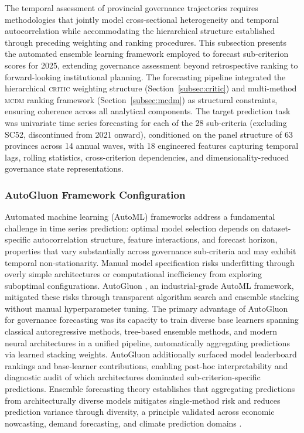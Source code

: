 \documentclass[12pt,a4paper]{article}
\newcommand{\MCDM}{\textsc{mcdm}\xspace}
\newcommand{\CRITIC}{\textsc{critic}\xspace}
\begin{document}
The temporal assessment of provincial governance trajectories requires methodologies that jointly model cross-sectional heterogeneity and temporal autocorrelation while accommodating the hierarchical structure established through preceding weighting and ranking procedures. This subsection presents the automated ensemble learning framework employed to forecast sub-criterion scores for 2025, extending governance assessment beyond retrospective ranking to forward-looking institutional planning. The forecasting pipeline integrated the hierarchical \CRITIC weighting structure (Section~\ref{subsec:critic}) and multi-method \MCDM ranking framework (Section~\ref{subsec:mcdm}) as structural constraints, ensuring coherence across all analytical components. The target prediction task was univariate time series forecasting for each of the 28 sub-criteria (excluding SC52, discontinued from 2021 onward), conditioned on the panel structure of 63 provinces across 14 annual waves, with 18 engineered features capturing temporal lags, rolling statistics, cross-criterion dependencies, and dimensionality-reduced governance state representations.

\subsubsection{AutoGluon Framework Configuration}
\label{subsubsec:autogluon_config}

Automated machine learning (AutoML) frameworks address a fundamental challenge in time series prediction: optimal model selection depends on dataset-specific autocorrelation structure, feature interactions, and forecast horizon, properties that vary substantially across governance sub-criteria and may exhibit temporal non-stationarity. Manual model specification risks underfitting through overly simple architectures or computational inefficiency from exploring suboptimal configurations. AutoGluon \citep{Erickson2020}, an industrial-grade AutoML framework, mitigated these risks through transparent algorithm search and ensemble stacking without manual hyperparameter tuning. The primary advantage of AutoGluon for governance forecasting was its capacity to train diverse base learners spanning classical autoregressive methods, tree-based ensemble methods, and modern neural architectures in a unified pipeline, automatically aggregating predictions via learned stacking weights. AutoGluon additionally surfaced model leaderboard rankings and base-learner contributions, enabling post-hoc interpretability and diagnostic audit of which architectures dominated sub-criterion-specific predictions. Ensemble forecasting theory establishes that aggregating predictions from architecturally diverse models mitigates single-method risk and reduces prediction variance through diversity, a principle validated across economic nowcasting, demand forecasting, and climate prediction domains \citep{Bates1969, Makridakis2017, Hastie2009}.
\end{document}
